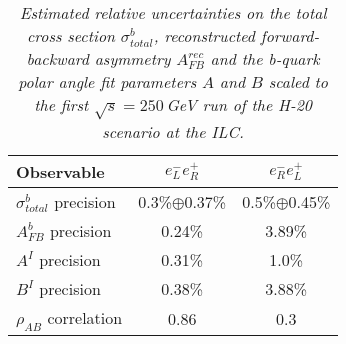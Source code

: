         \begin{table}
        \begin{center}
        \begin{tabular}{l c c}
        \hline
	Observable &  $e^-_Le^+_R$ &  $e^-_Re^+_L$\\
	\hline
	$\sigma^b_{total}$ precision  & 0.3\%$\oplus$0.37\%   & 0.5\%$\oplus$0.45\% \\
	$A_{FB}^{b}$ precision	  & 0.24\%  			  & 3.89\% \\
	\hline
	$A^I $ 	precision			  & 0.31\% 				  & 1.0\% \\
	$B^I $ 	precision			  & 0.38\% 				  & 3.88\% \\
	$\rho_{AB}$ correlation		  & 0.86				  & 0.3 \\
        \hline
        \end{tabular}
        \end{center}
        \caption{\sl Estimated relative uncertainties on the total cross section $\sigma^b_{total}$, reconstructed forward-backward asymmetry $A_{FB}^{rec}$ and the b-quark polar angle fit parameters $A$ and $B$ scaled to the first $\sqrt{s}=250$\,GeV run of the H-20 scenario at the ILC. }
        \label{table:bbbarfinal}
        \end{table}
